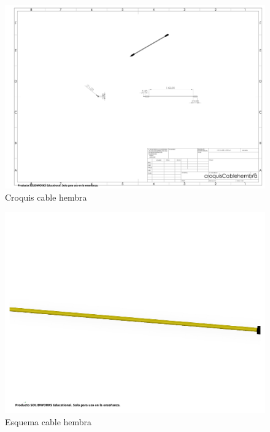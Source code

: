     \begin{figure}[H]
        \centering
        \includegraphics[trim = {1mm 1mm 1mm 1mm},clip,scale=0.2]{25/img/croquisCablehembra.pdf}
        \caption{Croquis cable hembra}
        \label{croquis: cable hembra}
    \end{figure}
    \begin{figure}[H]
        \centering
        \includegraphics[trim = {10mm 10mm 10mm 10mm},clip,scale=0.2]{25/img/cableHembra.pdf}
        \caption{Esquema cable hembra}
        \label{fig: cable hembra}
    \end{figure}
